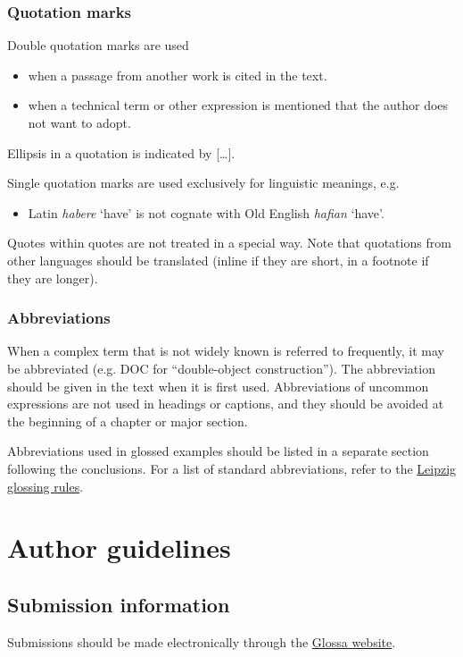 \documentclass[charis,linguex]{glossa}
\begin{document}
\subsubsection{Quotation marks}
Double quotation marks are used

\begin{itemize}
\item when a passage from another work is cited in the text.
\item when a technical term or other expression is mentioned that the author does not want to adopt.
\end{itemize}
Ellipsis in a quotation is indicated by [\ldots].

Single quotation marks are used exclusively for linguistic meanings, e.g.
\begin{itemize}
\item Latin \textit{habere} ‘have’ is not cognate with Old English \textit{hafian} ‘have’.
\end{itemize}
Quotes within quotes are not treated in a special way.
Note that quotations from other languages should be translated (inline if they are short, in a footnote if they are longer).

\subsubsection{Abbreviations}
When a complex term that is not widely known is referred to frequently, it may be abbreviated (e.g. DOC for ``double-object construction''). The abbreviation should be given in the text when it is first used. Abbreviations of uncommon expressions are not used in headings or captions, and they should be avoided at the beginning of a chapter or major section.

Abbreviations used in glossed examples should be listed in a separate section following the conclusions. For a list of standard abbreviations, refer to the \href{https://www.eva.mpg.de/lingua/resources/glossing-rules.php}{Leipzig glossing rules}. 


\section{Author guidelines}
\subsection{Submission information}

Submissions should be made electronically through the \href{http://glossa.ubiquitypress.com}{Glossa website}. 
\end{document}
